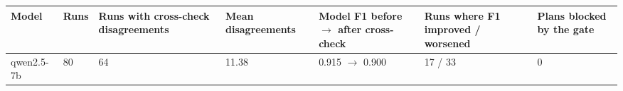 \begin{tabular}{lllllll}
\toprule
Model & Runs & Runs with cross-check disagreements & Mean disagreements & Model F1 before $\rightarrow$ after cross-check & Runs where F1 improved / worsened & Plans blocked by the gate \\
\midrule
qwen2.5-7b & 80 & 64 & 11.38 & 0.915 $\rightarrow$ 0.900 & 17 / 33 & 0 \\
\bottomrule
\end{tabular}
